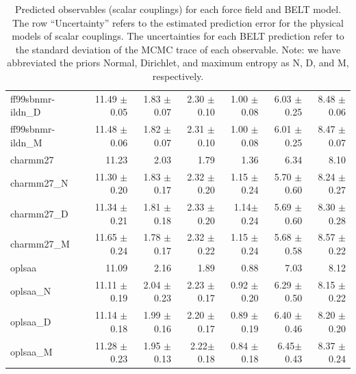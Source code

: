 \documentclass[12pt]{article}
\begin{document}
\begin{table}
\begin{tabular}{lrrrrrr}
ff99sbnmr-ildn\_D &    11.49 $\pm$ 0.05 &          1.83 $\pm$ 0.07  &      2.30 $\pm$ 0.10  &          1.00  $\pm$ 0.08 &      6.03 $\pm$ 0.25 &     8.48 $\pm$ 0.06  \\
ff99sbnmr-ildn\_M    &    11.48 $\pm$ 0.06  &          1.82 $\pm$ 0.07  &      2.31  $\pm$ 0.10 &          1.00 $\pm$ 0.08 &      6.01  $\pm$ 0.25 &     8.47  $\pm$ 0.07 \\
\toprule
charmm27                    &    11.23 &          2.03 &      1.79 &          1.36 &      6.34 &     8.10 \\
charmm27\_N                &    11.30 $\pm$ 0.20 &          1.83 $\pm$ 0.17 &      2.32 $\pm$ 0.20 &          1.15 $\pm$ 0.24 &      5.70 $\pm$ 0.60 &     8.24 $\pm$ 0.27 \\
charmm27\_D          &    11.34 $\pm$ 0.21 &          1.81 $\pm$ 0.18 &      2.33  $\pm$ 0.20 &          1.14$\pm$ 0.24  &      5.69 $\pm$ 0.60 &     8.30 $\pm$ 0.28 \\
charmm27\_M             &    11.65 $\pm$ 0.24 &          1.78 $\pm$ 0.17  &      2.32 $\pm$ 0.22 &          1.15 $\pm$ 0.24  &      5.68 $\pm$ 0.58  &     8.57 $\pm$ 0.22  \\
\toprule
oplsaa                      &    11.09 &          2.16 &      1.89 &          0.88 &      7.03 &     8.12 \\
oplsaa\_N                  &    11.11 $\pm$ 0.19 &          2.04 $\pm$ 0.23 &      2.23 $\pm$ 0.17  &          0.92 $\pm$ 0.20  &      6.29  $\pm$ 0.50  &     8.15 $\pm$ 0.22 \\
oplsaa\_D            &    11.14 $\pm$ 0.18 &          1.99  $\pm$ 0.16 &      2.20  $\pm$ 0.17  &          0.89 $\pm$ 0.19 &      6.40 $\pm$ 0.46 &     8.20 $\pm$ 0.20 \\
oplsaa\_M               &    11.28 $\pm$ 0.23  &          1.95 $\pm$ 0.13 &      2.22$\pm$ 0.18  &          0.84  $\pm$ 0.18&      6.45$\pm$ 0.43 &     8.37 $\pm$ 0.24 \\
\bottomrule
\end{tabular}


\caption{
Predicted observables (scalar couplings) for each force field and BELT model.  The row ``Uncertainty'' refers to the estimated prediction error for the physical models of scalar couplings.  The uncertainties for each BELT prediction refer to the standard deviation of the MCMC trace of each observable.  Note: we have abbreviated the priors Normal, Dirichlet, and maximum entropy as N, D, and M, respectively.   
}
\end{table}
\end{document}
